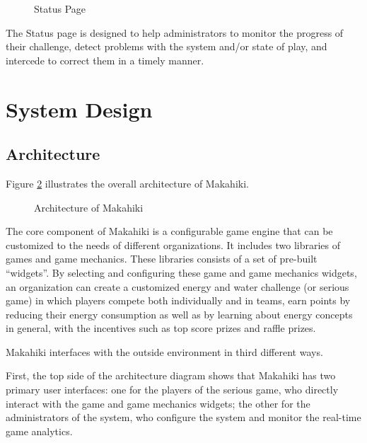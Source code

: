 \begin{figure}[!ht]
\begin{center}
\end{center}
\caption{Status Page}
\label{fig:makahiki-status}
\end{figure}

The Status page is designed to help administrators to monitor the progress of their challenge, detect problems with the system and/or state of play, and intercede to correct them in a timely manner.

\clearpage

\section{System Design}
\label{sec:makahiki-design}

\subsection{Architecture}

Figure \ref{fig:makahiki-architecture} illustrates the overall architecture of Makahiki.

\begin{figure}[!ht]
\begin{center}
\end{center}
\caption{Architecture of Makahiki}
\label{fig:makahiki-architecture}
\end{figure}

The core component of Makahiki is a configurable game engine that can be customized to the needs of different organizations.  It includes two libraries of games and game mechanics. These libraries consists of a set of pre-built ``widgets''. By selecting and configuring these game and game mechanics widgets, an organization can create a customized energy and water challenge (or serious game) in which players compete both individually and in teams, earn points by reducing their energy consumption as well as by learning about energy concepts in general, with the incentives such as top score prizes and raffle prizes.  

Makahiki interfaces with the outside environment in third different ways.

First, the top side of the architecture diagram shows that Makahiki has two primary user interfaces: one for the players of the serious game, who directly interact with the game and game mechanics widgets; the other for the administrators of the system, who configure the system and monitor the real-time game analytics.

